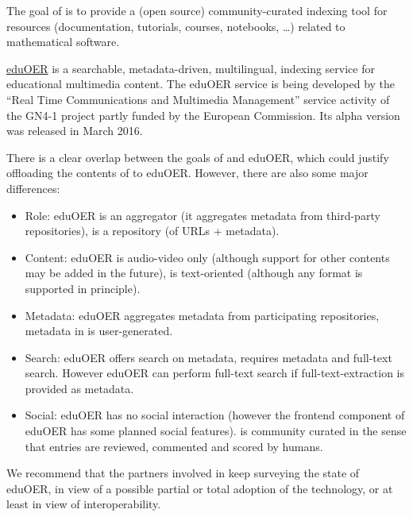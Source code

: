 \documentclass{deliverablereport}
\begin{document}
The goal of  is to provide a (open source)
community-curated indexing tool for resources (documentation,
tutorials, courses, notebooks, \dots) related to mathematical software.

\href{https://oer.geant.org/}{eduOER} is a searchable,
metadata-driven, multilingual, indexing service for educational
multimedia content. The eduOER service is being developed by the
``Real Time Communications and Multimedia Management'' service
activity of the GN4-1 project partly funded by the European
Commission. Its alpha version was released in March 2016.

There is a clear overlap between the goals of
 and eduOER, which could justify offloading
the contents of  to eduOER. However, there
are also some major differences:

\begin{itemize}
\item{Role:} eduOER is an aggregator (it aggregates metadata from
  third-party repositories),  is a
  repository (of URLs + metadata).
\item{Content:} eduOER is audio-video only (although support for other
  contents may be added in the future),  is
  text-oriented (although any format is supported in principle).
\item{Metadata:} eduOER aggregates metadata from participating
  repositories, metadata in  is
  user-generated.
\item{Search:} eduOER offers search on metadata,
   requires metadata and full-text
  search. However eduOER can perform full-text search if
  full-text-extraction is provided as metadata.
\item{Social:} eduOER has no social interaction (however the frontend
  component of eduOER has some planned social
  features).  is community curated in the
  sense that entries are reviewed, commented and scored by humans.
\end{itemize}

We recommend that the partners involved in 
keep surveying the state of eduOER, in view of a possible partial or
total adoption of the technology, or at least in view of
interoperability.

\end{document}
